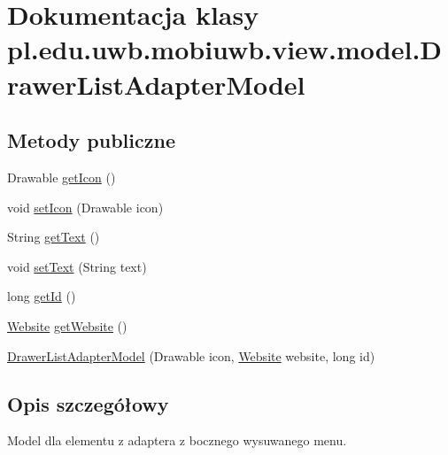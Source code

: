 \hypertarget{classpl_1_1edu_1_1uwb_1_1mobiuwb_1_1view_1_1model_1_1_drawer_list_adapter_model}{}\section{Dokumentacja klasy pl.\+edu.\+uwb.\+mobiuwb.\+view.\+model.\+Drawer\+List\+Adapter\+Model}
\label{classpl_1_1edu_1_1uwb_1_1mobiuwb_1_1view_1_1model_1_1_drawer_list_adapter_model}
\subsection*{Metody publiczne}
\begin{DoxyCompactItemize}
\item 
Drawable \hyperlink{classpl_1_1edu_1_1uwb_1_1mobiuwb_1_1view_1_1model_1_1_drawer_list_adapter_model_ab039aeb8c3e553e11c41d90bd71ed545}{get\+Icon} ()
\item 
void \hyperlink{classpl_1_1edu_1_1uwb_1_1mobiuwb_1_1view_1_1model_1_1_drawer_list_adapter_model_a20e84447dbe15345e63c54471b1705de}{set\+Icon} (Drawable icon)
\item 
String \hyperlink{classpl_1_1edu_1_1uwb_1_1mobiuwb_1_1view_1_1model_1_1_drawer_list_adapter_model_a28f24100c33db44ce1bb68d1527af7b1}{get\+Text} ()
\item 
void \hyperlink{classpl_1_1edu_1_1uwb_1_1mobiuwb_1_1view_1_1model_1_1_drawer_list_adapter_model_a43b43e3a430c154a7a0a13ed461fbdb7}{set\+Text} (String text)
\item 
long \hyperlink{classpl_1_1edu_1_1uwb_1_1mobiuwb_1_1view_1_1model_1_1_drawer_list_adapter_model_a6de20abd62a2595912090df5ebed79f9}{get\+Id} ()
\item 
\hyperlink{classpl_1_1edu_1_1uwb_1_1mobiuwb_1_1parsers_1_1xml_1_1model_1_1_website}{Website} \hyperlink{classpl_1_1edu_1_1uwb_1_1mobiuwb_1_1view_1_1model_1_1_drawer_list_adapter_model_afc89608f697faff18f8aa2cde2042f6d}{get\+Website} ()
\item 
\hyperlink{classpl_1_1edu_1_1uwb_1_1mobiuwb_1_1view_1_1model_1_1_drawer_list_adapter_model_ab2ab39e0c03ce3ffbff83e5b1b7e32f4}{Drawer\+List\+Adapter\+Model} (Drawable icon, \hyperlink{classpl_1_1edu_1_1uwb_1_1mobiuwb_1_1parsers_1_1xml_1_1model_1_1_website}{Website} website, long id)
\end{DoxyCompactItemize}


\subsection{Opis szczegółowy}
Model dla elementu z adaptera z bocznego wysuwanego menu. 

